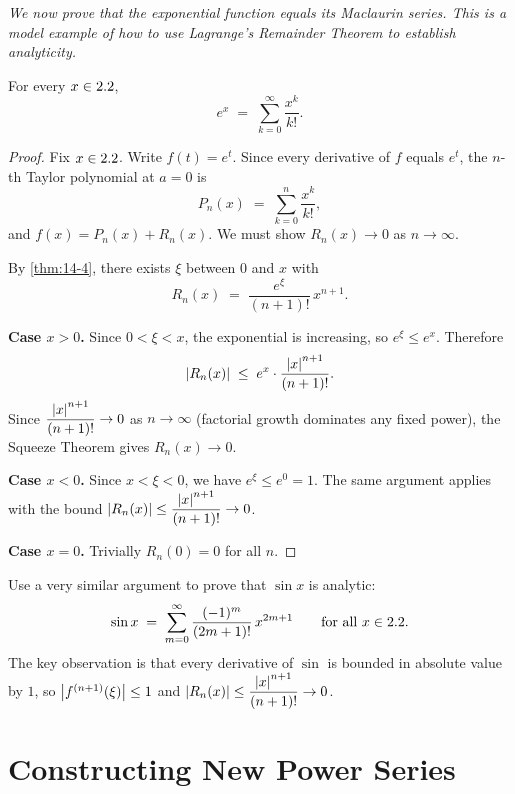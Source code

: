 \textit{We now prove that the exponential function equals its Maclaurin series.  This is a model example of how to use Lagrange's Remainder Theorem to establish analyticity.}

\begin{theorem}[$e^{x}$ is analytic]
\label{thm:14-5}
For every $x\in2.2$,
\[
  e^{x} \;=\; \sum_{k=0}^{\infty}\frac{x^{k}}{k!}.
\]
\end{theorem}

\begin{proof}
Fix $x\in2.2$.  Write $f(t)=e^{t}$.  Since every derivative of $f$ equals $e^{t}$, the $n$-th Taylor polynomial at $a=0$ is
\[
  P_{n}(x) \;=\; \sum_{k=0}^{n}\frac{x^{k}}{k!},
\]
and $f(x)=P_{n}(x)+R_{n}(x)$.  We must show $R_{n}(x)\to 0$ as $n\to\infty$.

By \cref{thm:14-4}, there exists $\xi$ between $0$ and $x$ with
\[
  R_{n}(x) \;=\; \frac{e^{\xi}}{(n+1)!}\,x^{n+1}.
\]

\textbf{Case $x>0$.}  Since $0<\xi<x$, the exponential is increasing, so $e^{\xi}\le e^{x}$.  Therefore
\[
  \left\lvert R_{n}(x) \right\rvert \;\le\; e^{x}\cdot\frac{\left\lvert x \right\rvert^{n+1}}{(n+1)!}.
\]
Since $\dfrac{\left\lvert x \right\rvert^{n+1}}{(n+1)!}\to 0$ as $n\to\infty$ (factorial growth dominates any fixed power), the Squeeze Theorem gives $R_{n}(x)\to 0$.

\textbf{Case $x<0$.}  Since $x<\xi<0$, we have $e^{\xi}\le e^{0}=1$.  The same argument applies with the bound $\left\lvert R_{n}(x) \right\rvert\le\dfrac{\left\lvert x \right\rvert^{n+1}}{(n+1)!}\to 0$.

\textbf{Case $x=0$.}  Trivially $R_{n}(0)=0$ for all $n$.
\end{proof}

\begin{remark}
Use a very similar argument to prove that $\sin x$ is analytic:
\[
  \sin x \;=\; \sum_{m=0}^{\infty}\frac{(-1)^{m}}{(2m+1)!}\,x^{2m+1}
  \qquad\text{for all } x\in2.2.
\]
The key observation is that every derivative of $\sin$ is bounded in absolute value by $1$, so $\left\lvert f^{(n+1)}(\xi) \right\rvert\le 1$ and $\left\lvert R_{n}(x) \right\rvert\le\dfrac{\left\lvert x \right\rvert^{n+1}}{(n+1)!}\to 0$.
\end{remark}

\section{Constructing New Power Series}
\label{sec:14.9}

